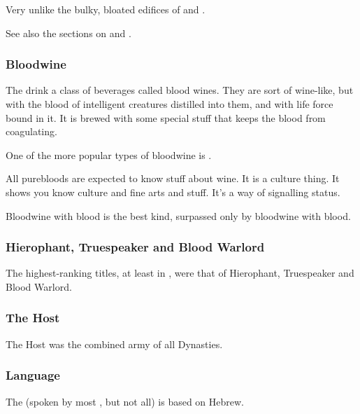 Very unlike the bulky, bloated edifices of  and . 

See also the sections on  and . 





\subsubsection{Bloodwine}
The \resphain{} drink a class of beverages called blood wines. 
They are sort of wine-like, but with the blood of intelligent creatures distilled into them, and with life force bound in it. 
It is brewed with some special stuff that keeps the blood from coagulating. 

One of the more popular types of bloodwine is \ethylshe. 

All \resphan{} purebloods are expected to know stuff about wine. 
It is a culture thing. 
It shows you know culture and fine arts and stuff. 
It's a way of signalling status. 

Bloodwine with \resphan{} blood is the best kind, surpassed only by bloodwine with \draconic{} blood. 





\subsubsection{Hierophant, Truespeaker and Blood Warlord}
The highest-ranking \resphan titles, at least in \Merkyrah, were that of Hierophant, Truespeaker and Blood Warlord. 





\subsubsection{The Host}
The Host was the combined army of all \resphan Dynasties.





\subsubsection{Language}
The  (spoken by most \resphain, but not all) is based on Hebrew. 

